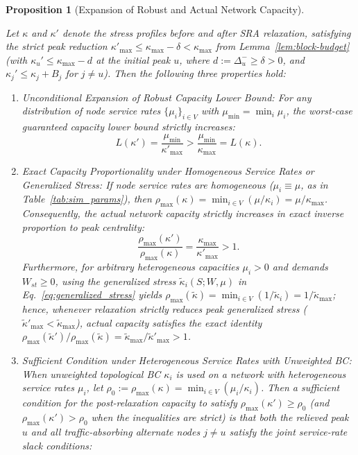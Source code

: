 \documentclass[journal]{IEEEtran}
\theoremstyle{plain}
\newtheorem{proposition}{Proposition}
\theoremstyle{definition}
\newcommand{\rev}[1]{{\color{blue}#1}}
\begin{document}
\begin{proposition}[\rev{Expansion of Robust and Actual Network Capacity}]
\label{prop:perf-bridge}
\rev{Let $\kappa$ and $\kappa'$ denote the stress profiles before and after SRA relaxation, satisfying the strict peak reduction $\kappa'_{\max} \le \kappa_{\max} - \delta < \kappa_{\max}$ from Lemma~\ref{lem:block-budget} (with $\kappa_u' \le \kappa_{\max} - d$ at the initial peak $u$, where $d := \Delta_u^- \ge \delta > 0$, and $\kappa_j' \le \kappa_j + B_j$ for $j \neq u$). Then the following three properties hold:
\begin{enumerate}[label=(\roman*)]
\item \emph{Unconditional Expansion of Robust Capacity Lower Bound:} For any distribution of node service rates $\{\mu_i\}_{i \in V}$ with $\mu_{\min} = \min_i \mu_i$, the worst-case guaranteed capacity lower bound strictly increases:
\begin{equation}\label{eq:robust_lower_bound_gain}
L(\kappa') = \frac{\mu_{\min}}{\kappa'_{\max}} > \frac{\mu_{\min}}{\kappa_{\max}} = L(\kappa).
\end{equation}
\item \emph{Exact Capacity Proportionality under Homogeneous Service Rates or Generalized Stress:} If node service rates are homogeneous ($\mu_i \equiv \mu$, as in Table~\ref{tab:sim_params}), then $\rho_{\max}(\kappa) = \min_{i \in V}(\mu/\kappa_i) = \mu/\kappa_{\max}$. Consequently, the actual network capacity strictly increases in exact inverse proportion to peak centrality:
\begin{equation}\label{eq:exact_capacity_ratio}
\frac{\rho_{\max}(\kappa')}{\rho_{\max}(\kappa)} = \frac{\kappa_{\max}}{\kappa'_{\max}} > 1.
\end{equation}
Furthermore, for arbitrary heterogeneous capacities $\mu_i > 0$ and demands $W_{st} \ge 0$, using the generalized stress $\widetilde{\kappa}_i(S; W, \mu)$ in Eq.~\eqref{eq:generalized_stress} yields $\rho_{\max}(\widetilde{\kappa}) = \min_{i \in V} (1/\widetilde{\kappa}_i) = 1/\widetilde{\kappa}_{\max}$; hence, whenever relaxation strictly reduces peak generalized stress ($\widetilde{\kappa}'_{\max} < \widetilde{\kappa}_{\max}$), actual capacity satisfies the exact identity $\rho_{\max}(\widetilde{\kappa}')/\rho_{\max}(\widetilde{\kappa}) = \widetilde{\kappa}_{\max}/\widetilde{\kappa}'_{\max} > 1$.
\item \emph{Sufficient Condition under Heterogeneous Service Rates with Unweighted BC:} When unweighted topological BC $\kappa_i$ is used on a network with heterogeneous service rates $\mu_i$, let $\rho_0 := \rho_{\max}(\kappa) = \min_{i \in V}(\mu_i/\kappa_i)$. Then a sufficient condition for the post-relaxation capacity to satisfy $\rho_{\max}(\kappa') \ge \rho_0$ (and $\rho_{\max}(\kappa') > \rho_0$ when the inequalities are strict) is that both the relieved peak $u$ and all traffic-absorbing alternate nodes $j \neq u$ satisfy the joint service-rate slack conditions:

\end{enumerate}}
\end{proposition}
\end{document}
